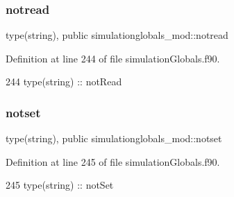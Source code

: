 \subsubsection{\texorpdfstring{notread}{notread}}
{\footnotesize\ttfamily type(string), public simulationglobals\+\_\+mod\+::notread}



Definition at line 244 of file simulation\+Globals.\+f90.


\begin{DoxyCode}
244     \textcolor{keywordtype}{type}(string) :: notRead
\end{DoxyCode}
\mbox{\label{namespacesimulationglobals__mod_a34d00a17e5931ddf3ab1a361f6299ae3}} 
\subsubsection{\texorpdfstring{notset}{notset}}
{\footnotesize\ttfamily type(string), public simulationglobals\+\_\+mod\+::notset}



Definition at line 245 of file simulation\+Globals.\+f90.


\begin{DoxyCode}
245     \textcolor{keywordtype}{type}(string) :: notSet
\end{DoxyCode}
